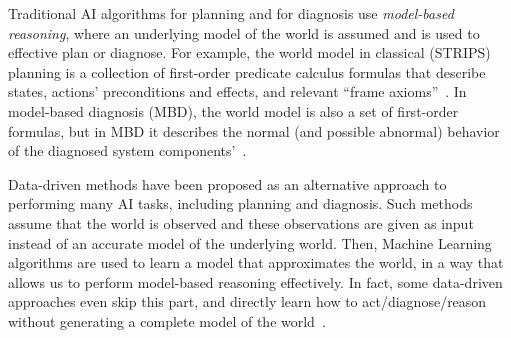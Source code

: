 \documentclass[12pt]{article}
\begin{document}





Traditional AI algorithms for planning and for diagnosis use {\em model-based reasoning}, where an underlying model of the world is assumed and is used to effective plan or diagnose. For example, the world model in classical (STRIPS) planning is a collection of first-order predicate calculus formulas that describe states, actions' preconditions and effects, and relevant ``frame axioms''~\cite{ghallab2004automated}. 
In model-based diagnosis (MBD), the world model is also a set of first-order formulas, but in MBD it describes the normal (and possible abnormal) behavior of the diagnosed system components'~\cite{reiter1987theory,deKleer1987diagnosing}. 



Data-driven methods have been proposed as an alternative approach to performing many AI tasks, including planning and diagnosis. Such methods assume that the world is observed and these observations are given as input instead of an accurate model of the underlying world. Then, Machine Learning algorithms are used to learn a model that approximates the world,   
in a way that allows us to perform model-based reasoning effectively. In fact, some data-driven approaches even skip this part, and directly learn how to act/diagnose/reason without generating a complete model of the world~\cite{kearns2002POMDPsample}. 
\end{document}
